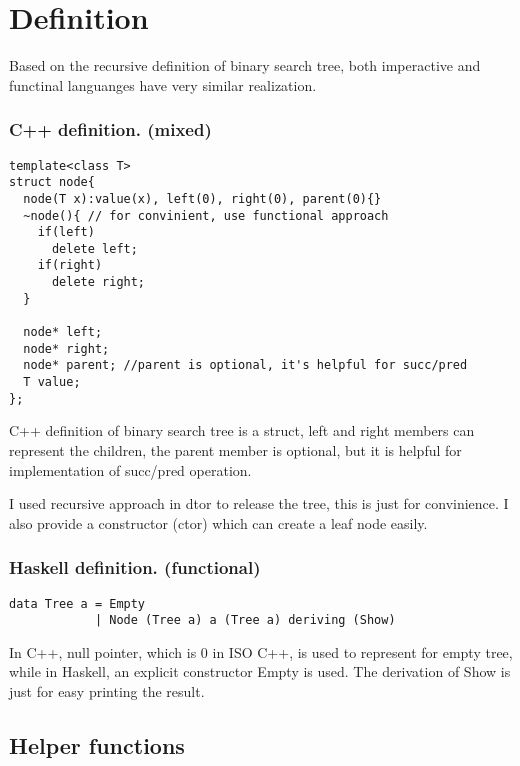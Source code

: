 \documentclass{article}
\begin{document}
\section{Definition}
\label{definition}

Based on the recursive definition of binary search tree, both imperactive and functinal 
languanges have very similar realization.

\subsubsection*{C++ definition. (mixed)}
\lstset{language=C++}
\begin{lstlisting}
template<class T>
struct node{
  node(T x):value(x), left(0), right(0), parent(0){}
  ~node(){ // for convinient, use functional approach
    if(left)
      delete left;
    if(right)
      delete right;
  }

  node* left; 
  node* right;
  node* parent; //parent is optional, it's helpful for succ/pred
  T value;
};
\end{lstlisting}

C++ definition of binary search tree is a struct, left
and right members can represent the children, the parent member is optional, but
it is helpful for implementation of succ/pred operation.

I used recursive approach in dtor to release the tree, this is just for 
convinience. I also provide a constructor (ctor) which can create a leaf
node easily.

\subsubsection*{Haskell definition. (functional)}
\lstset{language=Haskell}
\begin{lstlisting}
data Tree a = Empty 
            | Node (Tree a) a (Tree a) deriving (Show)
\end{lstlisting}

In C++, null pointer, which is 0 in ISO C++, is used to represent for empty
tree, while in Haskell, an explicit constructor Empty is used. The derivation
of Show is just for easy printing the result.

\subsection{Helper functions}
\end{document}

